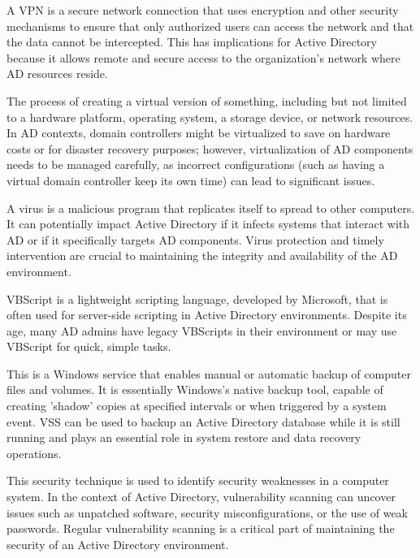 A VPN is a secure network connection that uses encryption and other security mechanisms to ensure that only authorized users can access the network and that the data cannot be intercepted. This has implications for Active Directory because it allows remote and secure access to the organization's network where AD resources reside.

 The process of creating a virtual version of something, including but not limited to a hardware platform, operating system, a storage device, or network resources. In AD contexts, domain controllers might be virtualized to save on hardware costs or for disaster recovery purposes; however, virtualization of AD components needs to be managed carefully, as incorrect configurations (such as having a virtual domain controller keep its own time) can lead to significant issues.

 A virus is a malicious program that replicates itself to spread to other computers. It can potentially impact Active Directory if it infects systems that interact with AD or if it specifically targets AD components. Virus protection and timely intervention are crucial to maintaining the integrity and availability of the AD environment.

 VBScript is a lightweight scripting language, developed by Microsoft, that is often used for server-side scripting in Active Directory environments. Despite its age, many AD admins have legacy VBScripts in their environment or may use VBScript for quick, simple tasks.

 This is a Windows service that enables manual or automatic backup of computer files and volumes. It is essentially Windows's native backup tool, capable of creating 'shadow' copies at specified intervals or when triggered by a system event. VSS can be used to backup an Active Directory database while it is still running and plays an essential role in system restore and data recovery operations.

 This security technique is used to identify security weaknesses in a computer system. In the context of Active Directory, vulnerability scanning can uncover issues such as unpatched software, security misconfigurations, or the use of weak passwords. Regular vulnerability scanning is a critical part of maintaining the security of an Active Directory environment.

